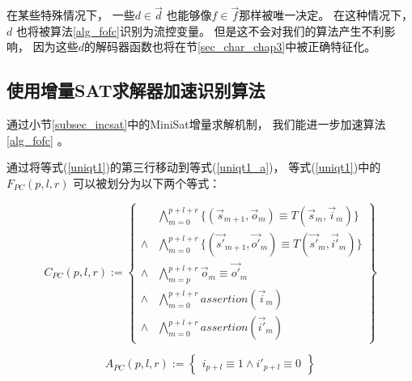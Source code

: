 在某些特殊情况下，
一些$d\in \vec{d}$ 也能够像$f\in \vec{f}$那样被唯一决定。
在这种情况下，
$d$ 也将被算法\ref{alg_fofc}识别为流控变量。
但是这不会对我们的算法产生不利影响，
因为这些$d$的解码器函数也将在节\ref{sec_char_chap3}中被正确特征化。


\subsection{使用增量SAT求解器加速识别算法}\label{incSAT}

通过小节\ref{subsec_incsat}中的MiniSat增量求解机制，
我们能进一步加速算法\ref{alg_fofc} 。

通过将等式(\ref{uniqt1})的第三行移动到等式(\ref{uniqt1_a})，
等式(\ref{uniqt1})中的$F_{PC}(p,l,r)$  可以被划分为以下两个等式：

\begin{equation}\label{uniqt1_f}
C_{PC}(p,l,r):=
\left\{
\begin{array}{cc}
&\bigwedge_{m=0}^{p+l+r}
\{
(\vec{s}_{m+1},\vec{o}_m)\equiv T(\vec{s}_m,\vec{i}_m)
\}
\\
\wedge&\bigwedge_{m=0}^{p+l+r}
\{
(\vec{s'}_{m+1},\vec{o'}_m)\equiv T(\vec{s'}_m,\vec{i'}_m)
\}
\\
\wedge&\bigwedge_{m=p}^{p+l+r}\vec{o}_m\equiv \vec{o'}_m \\
\wedge&\bigwedge_{m=0}^{p+l+r}assertion(\vec{i}_m) \\
\wedge&\bigwedge_{m=0}^{p+l+r}assertion(\vec{i'}_m)
\end{array}
\right\}
\end{equation}

\begin{equation}\label{uniqt1_a}
A_{PC}(p,l,r):=
\left\{
\begin{array}{c}
 i_{p+l}\equiv 1 \wedge  i'_{p+l}\equiv 0
\end{array}
\right\}
\end{equation}

